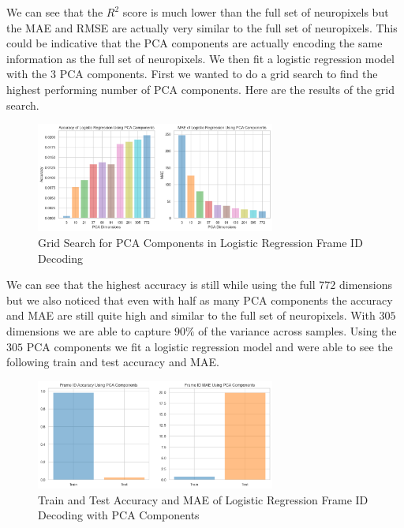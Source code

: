 \documentclass[12pt, letterpaper]{article}
\begin{document}
We can see that the $R^2$ score is much lower than the full set of neuropixels but the MAE and RMSE are actually very similar to the full set of neuropixels. This could be indicative that the PCA components are actually encoding the same information as the full set of neuropixels. We then fit a logistic regression model with the $3$ PCA components. First we wanted to do a grid search to find the highest performing number of PCA components. Here are the results of the grid search.

\begin{figure}[H]
    \centering
    \includegraphics[width=0.7\textwidth]{logistic_pca_accuracy_mae.png}
    \caption{Grid Search for PCA Components in Logistic Regression Frame ID Decoding}
    \label{fig:logistic_pca_accuracy_mae}
\end{figure}

We can see that the highest accuracy is still while using the full $772$ dimensions but we also noticed that even with half as many PCA components the accuracy and MAE are still quite high and similar to the full set of neuropixels. With $305$ dimensions we are able to capture $90\%$ of the variance across samples. Using the $305$ PCA components we fit a logistic regression model and were able to see the following train and test accuracy and MAE.

\begin{figure}[H]
    \centering
    \includegraphics[width=0.7\textwidth]{frame_id_metrics_logistic_C_.4_pca.png}
    \caption{Train and Test Accuracy and MAE of Logistic Regression Frame ID Decoding with PCA Components}
    \label{fig:logistic_pca_frame_id}
\end{figure}
\end{document}
